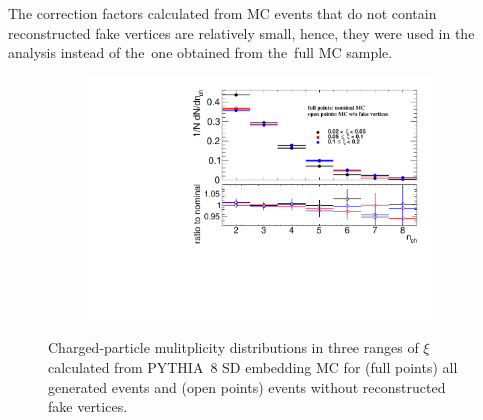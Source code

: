   The correction factors calculated from \ac{MC} events that do not contain reconstructed fake vertices   are relatively small, hence, they were used in the analysis instead of the~one obtained from the~full \ac{MC} sample.

\begin{figure}[h!]
	\centering
	\begin{subfigure}{.47\textwidth}
		\includegraphics[width=\textwidth,page=1]{chapters/chrgSTAR/img/vertex/nchFake.pdf}
	\end{subfigure}
	\begin{minipage}{.47\textwidth}
		\caption{Charged-particle mulitplicity distributions in three ranges of $\xi$ calculated from PYTHIA~8 SD embedding  MC for (full points) all generated events and (open points) events without reconstructed fake vertices.}
		\label{fig:nchVertex}
	\end{minipage}
	\vspace{-0.5cm}
\end{figure}

